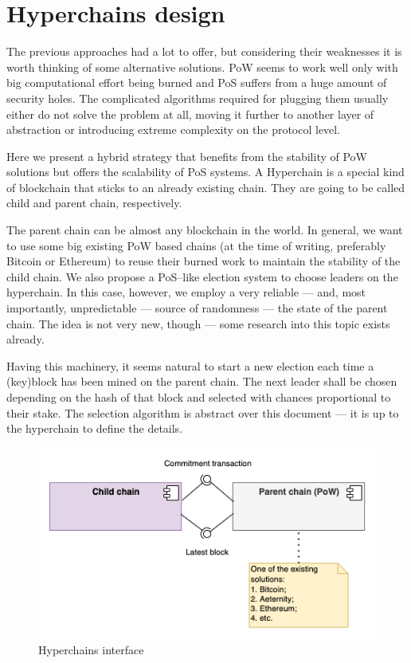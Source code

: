 \section{Hyperchains design}
\graphicspath{ {./images/} }

The previous approaches had a lot to offer, but considering their weaknesses it is worth
thinking of some alternative solutions. PoW seems to work well only with big
computational effort being burned and PoS suffers from a huge amount of security
holes. The complicated algorithms required for plugging them usually
either do not solve
the problem at all, moving it further to another layer of abstraction or introducing
extreme complexity on the protocol level.

Here we present a hybrid strategy that benefits from the stability of PoW
solutions but offers the scalability of PoS systems. A Hyperchain is a
special kind of blockchain that sticks to an already existing chain. They are
going to be called child and parent chain, respectively\cite{hyperchains}.

The parent chain can be almost any blockchain in the world. In general, we want
to use some big existing PoW based chains (at the time of writing, preferably
Bitcoin or Ethereum) to reuse their burned work to maintain
the stability of the child chain. We also propose a
PoS–like election system to choose leaders on the hyperchain. In this case,
however, we employ a very reliable — and, most importantly, unpredictable — source
of randomness — the state of the parent chain. The idea is not very new,
though — some research into this topic exists already\cite{blockchain_random}.

Having this machinery, it seems natural to start a new election each time a
(key)block has been mined on the parent chain. The next leader shall be chosen
depending on the hash of that block and selected with chances proportional to
their stake. The selection algorithm is abstract over this document — it is
up to the hyperchain to define the details.

\begin{figure}[b]
     \caption{Hyperchains interface}
     \centering
     \includegraphics[scale=0.5]{hyperchains_interface}
\end{figure}

